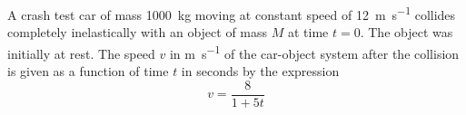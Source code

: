 \documentclass{../../oss-apphys-exam}
\begin{document}
\begin{questions}
  \newpage
  
  \question A crash test car of mass \SI{1000}{\kilo\gram} moving at constant
  speed of \SI{12}{\metre\per\second} collides completely inelastically with an
  object of mass $M$ at time $t=0$. The object was initially at rest. The speed
  $v$ in \si{\metre\per\second} of the car-object system after the collision is
  given as a function of time $t$ in seconds by the expression
  \begin{displaymath}
    v=\frac8{1 + 5t}
  \end{displaymath}
\end{questions}
\end{document}
